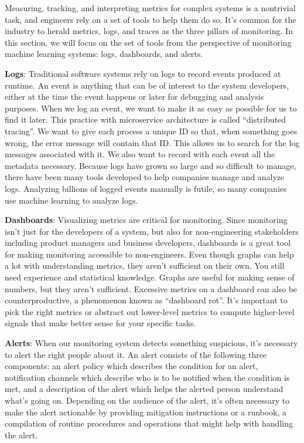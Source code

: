 Measuring, tracking, and interpreting metrics for complex systems is a nontrivial task, and engineers rely on a set
of tools to help them do so. It's common for the industry to herald metrics, logs, and traces as the three pillars of
monitoring. In this section, we will focus on the set of tools from the perspective of monitoring machine learning
systems: logs, dashboards, and alerts.
\bit
\item \textbf{Logs}: Traditional software systems rely on logs to record events produced at runtime. An event is
anything that can be of interest to the system developers, either at the time the event happens or later for
debugging and analysis purposes. When we log an event, we want to make it as easy as possible for us to find it later.
This practice with microservice architecture is called ``distributed tracing''. We want to give each process a
unique ID so that, when something goes wrong, the error message will contain that ID. This allows us to search for
the log messages associated with it. We also want to record with each event all the metadata necessary. Because logs
have grown so large and so difficult to manage, there have been many tools developed to help companies manage and
analyze logs. Analyzing billions of logged events manually is futile, so many companies use machine learning to analyze
logs.
\item \textbf{Dashboards}: Visualizing metrics are critical for monitoring. Since monitoring isn't just for the
developers of a system, but also for non-engineering stakeholders including product managers and business developers,
dashboards is a great tool for making monitoring accessible to non-engineers. Even though graphs can help a lot
with understanding metrics, they aren't sufficient on their own. You still need experience and statistical knowledge.
Graphs are useful for making sense of numbers, but they aren't sufficient. Excessive metrics on a dashboard can
also be counterproductive, a phenomenon known as ``dashboard rot''. It's important to pick the right metrics or
abstract out lower-level metrics to compute higher-level signals that make better sense for your specific tasks.
\item \textbf{Alerts}: When our monitoring system detects something suspicious, it's necessary to alert the right
people about it. An alert consists of the following three components: an alert policy which describes the condition
for an alert, notification channels which describe who is to be notified when the condition is met, and a description
of the alert which helps the alerted person understand what's going on. Depending on the audience of the alert, it's
often necessary to make the alert actionable by providing mitigation instructions or a runbook, a compilation of
routine procedures and operations that might help with handling the alert.
\eit

